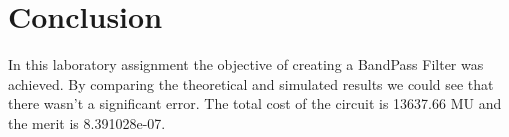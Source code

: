 \pagebreak
\section{Conclusion}
\label{sec:conclusion}

In this laboratory assignment the objective of creating a BandPass Filter was achieved. By comparing the theoretical and simulated results we could see that there wasn't a significant error.
The total cost of the circuit is 13637.66 MU and the merit is 8.391028e-07.
